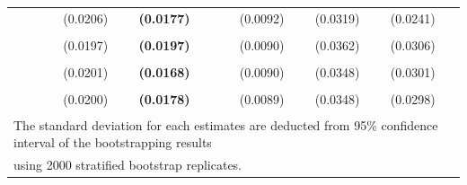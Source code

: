 \documentclass[
  12pt,
]{article}
\begin{document}
\begin{table}[H]
{\begin{tabular}[t]{llll>{}lllll}
 &  &  & (0.0206) & \textbf{(0.0177)} &  & (0.0092) & (0.0319) & (0.0241)\\
\addlinespace
\cellcolor{gray!6}{c.hp400k.r20} & \cellcolor{gray!6}{-93.8576} & \cellcolor{gray!6}{-99.9257} & \cellcolor{gray!6}{0.6991} & \textbf{\cellcolor{gray!6}{0.6340}} & \cellcolor{gray!6}{4.3393} & \cellcolor{gray!6}{0.3622} & \cellcolor{gray!6}{0.3295} & \cellcolor{gray!6}{0.2398}\\
 &  &  & (0.0197) & \textbf{(0.0197)} &  & (0.0090) & (0.0362) & (0.0306)\\
\addlinespace
\cellcolor{gray!6}{c.bn2.r20} & \cellcolor{gray!6}{-84.0800} & \cellcolor{gray!6}{-90.1481} & \cellcolor{gray!6}{0.6955} & \textbf{\cellcolor{gray!6}{0.6297}} & \cellcolor{gray!6}{0.2773} & \cellcolor{gray!6}{0.4216} & \cellcolor{gray!6}{0.3182} & \cellcolor{gray!6}{0.2790}\\
 &  &  & (0.0201) & \textbf{(0.0168)} &  & (0.0090) & (0.0348) & (0.0301)\\
\addlinespace
\cellcolor{gray!6}{c.stm.r20} & \cellcolor{gray!6}{-87.6992} & \cellcolor{gray!6}{-93.7673} & \cellcolor{gray!6}{0.6879} & \textbf{\cellcolor{gray!6}{0.6282}} & \cellcolor{gray!6}{3.1055} & \cellcolor{gray!6}{0.4073} & \cellcolor{gray!6}{0.3239} & \cellcolor{gray!6}{0.2708}\\
 &  &  & (0.0200) & \textbf{(0.0178)} &  & (0.0089) & (0.0348) & (0.0298)\\
\bottomrule
\multicolumn{9}{l}{\textsuperscript{} The standard deviation for each estimates are deducted from 95\% confidence interval of the bootstrapping results}\\
\multicolumn{9}{l}{using 2000 stratified bootstrap replicates.}\\
\end{tabular}}
\end{table}
\end{document}

